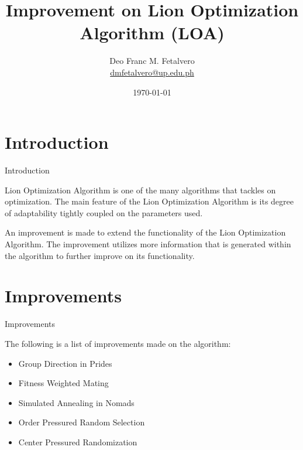 \documentclass[xcolor=table]{beamer}
\title[Improvement on LOA]{Improvement on Lion Optimization Algorithm (LOA)} %
\author[Deo Fetalvero]
{%
   \texorpdfstring{
     \centering
     Deo Franc M. Fetalvero\\
     \href{mailto:dmfetalvero@up.edu.ph}{dmfetalvero@up.edu.ph}
   }
   {Deo Fetalvero}
}
\date{\today} %
\begin{document}
\begin{frame}
\titlepage %
\end{frame}


\section{Introduction}

\begin{frame}{Introduction}
\par Lion Optimization Algorithm is one of the many algorithms that tackles on optimization. The main feature of the Lion Optimization Algorithm is its degree of adaptability tightly coupled on the parameters used.
\vspace{0.2in}
\par An improvement is made to extend the functionality of the Lion Optimization Algorithm. The improvement utilizes more information that is generated within the algorithm to further improve on its functionality.
\end{frame}

\section{Improvements}

\begin{frame}{Improvements}
\par The following is a list of improvements made on the algorithm:
  \begin{itemize}
    \item Group Direction in Prides
    \item Fitness Weighted Mating
    \item Simulated Annealing in Nomads
    \item Order Pressured Random Selection
    \item Center Pressured Randomization
  \end{itemize}
\end{frame}
\end{document}
